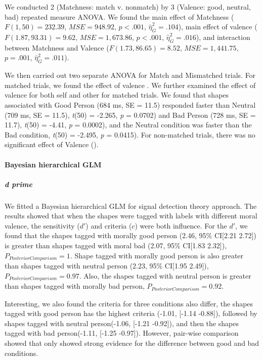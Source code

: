 \documentclass[
  english,
  man]{apa6}
\let\oldparagraph\paragraph
\renewcommand{\paragraph}[1]{\oldparagraph{#1}\mbox{}}
\let\oldsubparagraph\subparagraph
\renewcommand{\subparagraph}[1]{\oldsubparagraph{#1}\mbox{}}
\begin{document}
We conducted 2 (Matchness: match v. nonmatch) by 3 (Valence: good, neutral, bad) repeated measure ANOVA. We found the main effect of Matchness (\(F(1, 50) = 232.39\), \(\mathit{MSE} = 948.92\), \(p < .001\), \(\hat{\eta}^2_G = .104\)), main effect of valence (\(F(1.87, 93.31) = 9.62\), \(\mathit{MSE} = 1,673.86\), \(p < .001\), \(\hat{\eta}^2_G = .016\)), and interaction between Matchness and Valence (\(F(1.73, 86.65) = 8.52\), \(\mathit{MSE} = 1,441.75\), \(p = .001\), \(\hat{\eta}^2_G = .011\)).

We then carried out two separate ANOVA for Match and Mismatched trials. For matched trials, we found the effect of valence . We further examined the effect of valence for both self and other for matched trials. We found that shapes associated with Good Person (684 ms, SE = 11.5) responded faster than Neutral (709 ms, SE = 11.5), \emph{t}(50) = -2.265, \emph{p} = 0.0702) and Bad Person (728 ms, SE = 11.7), \emph{t}(50) = -4.41, \emph{p} = 0.0002), and the Neutral condition was faster than the Bad condition, \emph{t}(50) = -2.495, \emph{p} = 0.0415). For non-matched trials, there was no significant effect of Valence ().

\hypertarget{bayesian-hierarchical-glm}{%
\paragraph{Bayesian hierarchical GLM}\label{bayesian-hierarchical-glm}}

\hypertarget{d-prime-1}{%
\subparagraph{d prime}\label{d-prime-1}}

We fitted a Bayesian hierarchical GLM for signal detection theory approach. The results showed that when the shapes were tagged with labels with different moral valence, the sensitivity (\(d'\)) and criteria (\(c\)) were both influence. For the \(d'\), we found that the shapes tagged with morally good person (2.46, 95\% CI{[}2.21 2.72{]}) is greater than shapes tagged with moral bad (2.07, 95\% CI{[}1.83 2.32{]}), \(P_{PosteriorComparison} = 1\). Shape tagged with morally good person is also greater than shapes tagged with neutral person (2.23, 95\% CI{[}1.95 2.49{]}), \(P_{PosteriorComparison} = 0.97\). Also, the shapes tagged with neutral person is greater than shapes tagged with morally bad person, \(P_{PosteriorComparison} = 0.92\).

Interesting, we also found the criteria for three conditions also differ, the shapes tagged with good person has the highest criteria (-1.01, {[}-1.14 -0.88{]}), followed by shapes tagged with neutral person(-1.06, {[}-1.21 -0.92{]}), and then the shapes tagged with bad person(-1.11, {[}-1.25 -0.97{]}). However, pair-wise comparison showed that only showed strong evidence for the difference between good and bad conditions.
\end{document}
